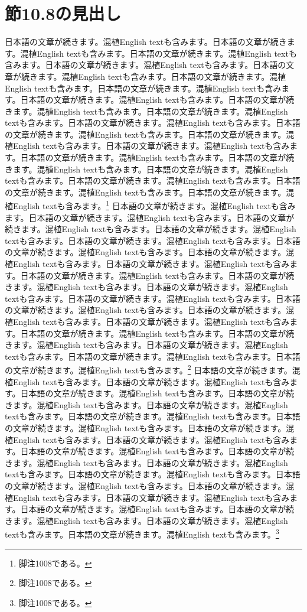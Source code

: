 \documentclass[pdflatex,book]{jlreq}
\begin{document}
\section{節10.8の見出し}
日本語の文章が続きます。混植English textも含みます。日本語の文章が続きます。混植English textも含みます。日本語の文章が続きます。混植English textも含みます。日本語の文章が続きます。混植English textも含みます。日本語の文章が続きます。混植English textも含みます。日本語の文章が続きます。混植English textも含みます。日本語の文章が続きます。混植English textも含みます。日本語の文章が続きます。混植English textも含みます。日本語の文章が続きます。混植English textも含みます。日本語の文章が続きます。混植English textも含みます。日本語の文章が続きます。混植English textも含みます。日本語の文章が続きます。混植English textも含みます。日本語の文章が続きます。混植English textも含みます。日本語の文章が続きます。混植English textも含みます。日本語の文章が続きます。混植English textも含みます。日本語の文章が続きます。混植English textも含みます。日本語の文章が続きます。混植English textも含みます。日本語の文章が続きます。混植English textも含みます。日本語の文章が続きます。混植English textも含みます。日本語の文章が続きます。混植English textも含みます。\footnote{脚注1008である。}
日本語の文章が続きます。混植English textも含みます。日本語の文章が続きます。混植English textも含みます。日本語の文章が続きます。混植English textも含みます。日本語の文章が続きます。混植English textも含みます。日本語の文章が続きます。混植English textも含みます。日本語の文章が続きます。混植English textも含みます。日本語の文章が続きます。混植English textも含みます。日本語の文章が続きます。混植English textも含みます。日本語の文章が続きます。混植English textも含みます。日本語の文章が続きます。混植English textも含みます。日本語の文章が続きます。混植English textも含みます。日本語の文章が続きます。混植English textも含みます。日本語の文章が続きます。混植English textも含みます。日本語の文章が続きます。混植English textも含みます。日本語の文章が続きます。混植English textも含みます。日本語の文章が続きます。混植English textも含みます。日本語の文章が続きます。混植English textも含みます。日本語の文章が続きます。混植English textも含みます。日本語の文章が続きます。混植English textも含みます。日本語の文章が続きます。混植English textも含みます。\footnote{脚注1008である。}
日本語の文章が続きます。混植English textも含みます。日本語の文章が続きます。混植English textも含みます。日本語の文章が続きます。混植English textも含みます。日本語の文章が続きます。混植English textも含みます。日本語の文章が続きます。混植English textも含みます。日本語の文章が続きます。混植English textも含みます。日本語の文章が続きます。混植English textも含みます。日本語の文章が続きます。混植English textも含みます。日本語の文章が続きます。混植English textも含みます。日本語の文章が続きます。混植English textも含みます。日本語の文章が続きます。混植English textも含みます。日本語の文章が続きます。混植English textも含みます。日本語の文章が続きます。混植English textも含みます。日本語の文章が続きます。混植English textも含みます。日本語の文章が続きます。混植English textも含みます。日本語の文章が続きます。混植English textも含みます。日本語の文章が続きます。混植English textも含みます。日本語の文章が続きます。混植English textも含みます。日本語の文章が続きます。混植English textも含みます。日本語の文章が続きます。混植English textも含みます。\footnote{脚注1008である。}
\end{document}
